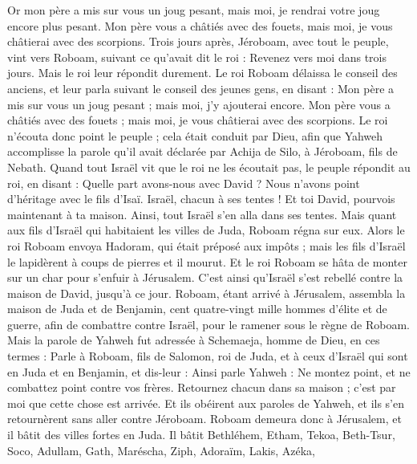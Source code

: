 \begin{multicols}{2}
Or mon père a mis sur vous un joug pesant, mais moi, je rendrai votre joug encore plus pesant. Mon père vous a châtiés avec des fouets, mais moi, je vous châtierai avec des scorpions.
Trois jours après, Jéroboam, avec tout le peuple, vint vers Roboam, suivant ce qu’avait dit le roi : Revenez vers moi dans trois jours.
Mais le roi leur répondit durement. Le roi Roboam délaissa le conseil des anciens,
et leur parla suivant le conseil des jeunes gens, en disant : Mon père a mis sur vous un joug pesant ; mais moi, j'y ajouterai encore. Mon père vous a châtiés avec des fouets ; mais moi, je vous châtierai avec des scorpions.
Le roi n'écouta donc point le peuple ; cela était conduit par Dieu, afin que Yahweh accomplisse la parole qu'il avait déclarée par Achija de Silo, à Jéroboam, fils de Nebath.
Quand tout Israël vit que le roi ne les écoutait pas, le peuple répondit au roi, en disant : Quelle part avons-nous avec David ? Nous n'avons point d'héritage avec le fils d'Isaï. Israël, chacun à ses tentes ! Et toi David, pourvois maintenant à ta maison. Ainsi, tout Israël s'en alla dans ses tentes.
Mais quant aux fils d’Israël qui habitaient les villes de Juda, Roboam régna sur eux.
Alors le roi Roboam envoya Hadoram, qui était préposé aux impôts ; mais les fils d’Israël le lapidèrent à coups de pierres et il mourut. Et le roi Roboam se hâta de monter sur un char pour s'enfuir à Jérusalem.
C'est ainsi qu'Israël s'est rebellé contre la maison de David, jusqu'à ce jour.
\VerseOne{}Roboam, étant arrivé à Jérusalem, assembla la maison de Juda et de Benjamin, cent quatre-vingt mille hommes d’élite et de guerre, afin de combattre contre Israël, pour le ramener sous le règne de Roboam.
Mais la parole de Yahweh fut adressée à Schemaeja, homme de Dieu, en ces termes :
Parle à Roboam, fils de Salomon, roi de Juda, et à ceux d'Israël qui sont en Juda et en Benjamin, et dis-leur :
Ainsi parle Yahweh : Ne montez point, et ne combattez point contre vos frères. Retournez chacun dans sa maison ; c’est par moi que cette chose est arrivée. Et ils obéirent aux paroles de Yahweh, et ils s'en retournèrent sans aller contre Jéroboam.
Roboam demeura donc à Jérusalem, et il bâtit des villes fortes en Juda.
Il bâtit Bethléhem, Etham, Tekoa,
Beth-Tsur, Soco, Adullam,
Gath, Maréscha, Ziph,
Adoraïm, Lakis, Azéka,

\end{multicols}
